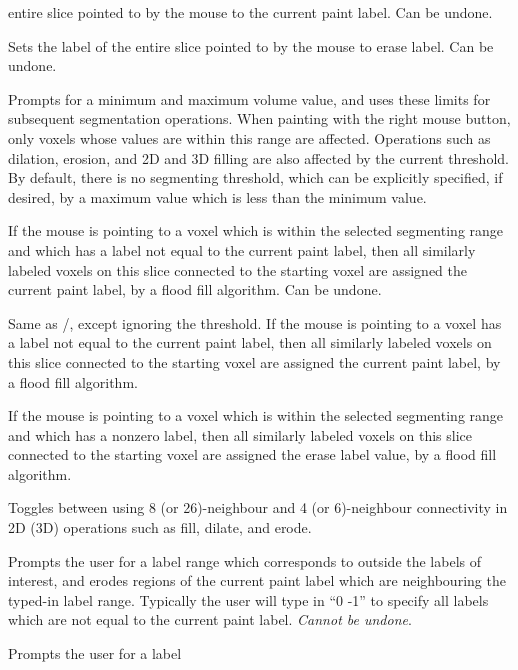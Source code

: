 \documentclass[11pt,letterpaper]{article}
\newcommand{\menutwo}[2]{{\scriptsize \fbox{\bf #1}/\fbox{\bf #2}}}
\begin{document}
\begin{description}
  entire slice pointed to by the mouse to the current paint label. Can
  be undone.
\item[\menutwo{Segmenting}{Clear Slice}]  Sets the label of the 
  entire slice pointed to by the mouse to erase label. Can be undone.
\item[\menutwo{Segmenting}{Set Threshold}]  Prompts for a minimum and
  maximum volume value, and uses these limits for subsequent segmentation
  operations.  When painting with the right mouse button, only
  voxels whose values are within this range are affected.  Operations
  such as dilation, erosion, and 2D and 3D filling are also affected by
  the current threshold.  By default, there is no segmenting threshold,
  which can be explicitly specified, if desired, by a maximum value which is 
  less than the minimum value.
\item[\menutwo{Segmenting}{Label Fill}] If the mouse is pointing to a
  voxel which is within the selected segmenting range and which has a
  label not equal to the current paint label, then all similarly labeled
  voxels on this slice connected to the starting voxel are assigned the
  current paint label, by a flood fill algorithm. Can be undone.
\item[\menutwo{Segmenting}{Label Fill No Thrs}] Same as
  \menutwo{Segmenting}{Label Fill}, except ignoring the threshold. If
  the mouse is pointing to a voxel has a label not equal to the current
  paint label, then all similarly labeled voxels on this slice connected
  to the starting voxel are assigned the current paint label, by a flood
  fill algorithm.
\item[\menutwo{Segmenting}{Clear Fill}] If the mouse is pointing to a
  voxel which is within the selected segmenting range and which has a
  nonzero label, then all similarly labeled voxels on this slice
  connected to the starting voxel are assigned the erase label value, by
  a flood fill algorithm.
\item[\menutwo{Segmenting}{Connectivity}] Toggles between using 8 (or
  26)-neighbour and 4 (or 6)-neighbour connectivity in 2D (3D)
  operations such as fill, dilate, and erode.
\item[\menutwo{Segmenting}{Erode 3D}] Prompts the user for a label range
  which corresponds to outside the labels of interest, and erodes
  regions of the current paint label which are neighbouring the typed-in
  label range. Typically the user will type in ``0 -1'' to specify all
  labels which are not equal to the current paint label. {\em Cannot be
    undone}.
\item[\menutwo{Segmenting}{Dilate 3D}] Prompts the user for a label

\end{description}
\end{document}
